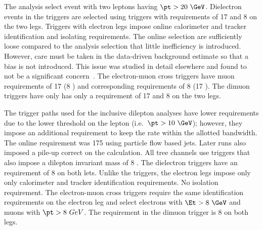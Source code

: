 The \hpt analysis select event with two leptons having $\pt > 20\ \GeV$.
Dielectron events in the \hpt triggers are selected using triggers with
\Et requirements of 17 and 8 \GeV on the two legs. Triggers with electron
legs impose online calorimeter and tracker identification and isolating
requirements. The online selection are sufficiently loose compared to the analysis
selection that little inefficiency is introduced. However, care must be taken
in the data-driven background estimate so that a bias is not introduced.
This issue was studied in detail elsewhere and found to not be a significant
concern~\cite{an_ufl2013}. The electron-muon cross triggers have muon \pt
requirements of 17 \GeV (8 \GeV) and corresponding \Et requirements of 8 \GeV
(17 \GeV). The dimuon triggers have only has only a \pt requirement of 17 and 8
\GeV on the two legs.

The trigger paths used for the inclusive dilepton analyses have lower \pt
requirements due to the lower threshold on the lepton (i.e.~$\pt > 10\ \GeV$);
however, they impose an additional \HT requirement to keep the rate within the
allotted bandwidth. The online \HT requirement was 175 \GeV using particle flow
based jets. Later runs also imposed a pile-up correct on the \HT calculation.
All tree channels use triggers that also impose a dilepton invariant mass of
8 \GeV. The dielectron triggers have an \Et requirement of 8 \GeV on both
lets. Unlike the \hpt triggers, the electron legs impose only only calorimeter
and tracker identification requirements. No isolation requirement. The
electron-muon cross triggers require the same identification requirements on
the electron leg and select electrons with $\Et > 8\ \GeV$ and muons with $\pt
> 8\ GeV$. The \pt requirement in the dimuon trigger is 8 \GeV on both legs.

